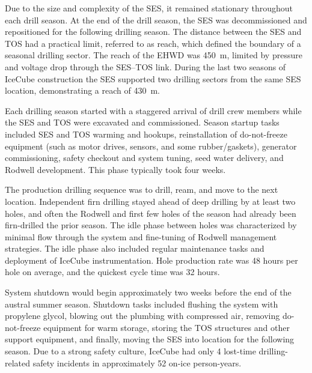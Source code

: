 Due to the size and complexity of the SES, it remained stationary
throughout each drill season.  At the end of the drill season, the SES was
decommissioned and repositioned for the following drilling season.  The
distance between the SES and TOS had a practical limit, referred to as
reach, which defined the boundary of a seasonal drilling sector.  The reach
of the EHWD was 450~m, limited by pressure and voltage drop through the
SES--TOS link.  During the last two seasons of IceCube construction the SES
supported two drilling sectors from the same SES location, demonstrating a
reach of 430~m.

Each drilling season started with a staggered arrival of drill crew members
while the SES and TOS were excavated and commissioned.  Season startup
tasks included SES and TOS warming and hookups, reinstallation of
do-not-freeze equipment (such as motor drives, sensors, and some
rubber/gaskets), generator commissioning, safety checkout and system
tuning, seed water delivery, and Rodwell development.  This phase typically
took four weeks.

The production drilling sequence was to drill, ream, and move to the next
location.  Independent firn drilling stayed ahead of deep drilling by at
least two holes, and often the Rodwell and first few holes of
the season had already been firn-drilled the prior season.  The idle phase
between holes was characterized by minimal flow through the
system and fine-tuning of Rodwell management strategies.  The idle phase
also included regular maintenance tasks and deployment of IceCube
instrumentation.  Hole production rate was 48 hours per hole on average,
and the quickest cycle time was 32 hours.

System shutdown would begin approximately two weeks before the end of the
austral summer season. Shutdown tasks included flushing the system with
propylene glycol, blowing out the plumbing with compressed air, removing
do-not-freeze equipment for warm storage, storing the TOS structures and
other support equipment, and finally, moving the SES into location for the
following season.  Due to a strong safety culture, IceCube had only 4
lost-time drilling-related safety incidents in approximately 52 on-ice 
person-years. 


